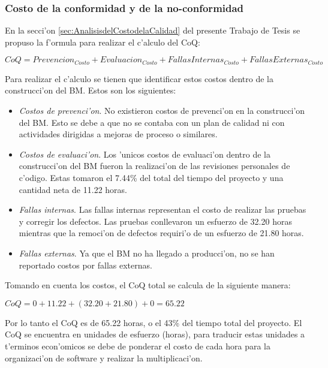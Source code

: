\subsubsection{Costo de la conformidad y de la no-conformidad}
\label{Costodelaconformidadydelanoconformidad}
\noindent
En la secci'on \ref{sec:AnalisisdelCostodelaCalidad} del presente Trabajo de Tesis se propuso la f'ormula para realizar el c'alculo del CoQ\cite{Lazic2009}:

\begin{math}CoQ = Prevencion_{Costo} + Evaluacion_{Costo} + FallasInternas_{Costo} + FallasExternas_{Costo}\end{math}

Para realizar el c'alculo se tienen que identificar estos costos dentro de la construcci'on del BM. Estos son los siguientes:

\begin{itemize}
	\item \emph{Costos de prevenci'on}. No existieron costos de prevenci'on en la construcci'on del BM. Esto se debe a que no se contaba con un plan de calidad ni con actividades dirigidas a mejoras de proceso o similares.
	\item \emph{Costos de evaluaci'on}. Los 'unicos costos de evaluaci'on dentro de la construcci'on del BM fueron la realizaci'on de las revisiones personales de c'odigo. Estas tomaron el 7.44\% del total del tiempo del proyecto y una cantidad neta de 11.22 horas.
	\item \emph{Fallas internas}. Las fallas internas representan el costo de realizar las pruebas y corregir los defectos. Las pruebas conllevaron un esfuerzo de 32.20 horas mientras que la remoci'on de defectos requiri'o de un esfuerzo de 21.80 horas.
	\item \emph{Fallas externas}. Ya que el BM no ha llegado a producci'on, no se han reportado costos por fallas externas.
\end{itemize}

Tomando en cuenta los costos, el CoQ total se calcula de la siguiente manera:

\begin{math}CoQ = 0 + 11.22 + (32.20+21.80) + 0 = 65.22\end{math}

Por lo tanto el CoQ es de 65.22 horas, o el 43\% del tiempo total del proyecto. El CoQ se encuentra en unidades de esfuerzo (horas), para traducir estas unidades a t'erminos econ'omicos se debe de ponderar el costo de cada hora para la organizaci'on de software y realizar la multiplicaci'on.

